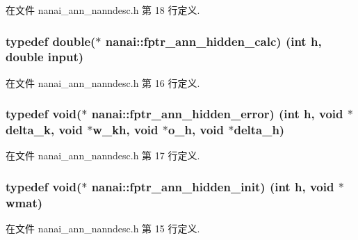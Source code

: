 在文件 nanai\+\_\+ann\+\_\+nanndesc.\+h 第 18 行定义.

\hypertarget{namespacenanai_a299d9093f72831a48d205e94e200690c}{}
\subsubsection[{fptr\+\_\+ann\+\_\+hidden\+\_\+calc}]{\setlength{\rightskip}{0pt plus 5cm}typedef double($\ast$ nanai\+::fptr\+\_\+ann\+\_\+hidden\+\_\+calc) (int h, double input)}\label{namespacenanai_a299d9093f72831a48d205e94e200690c}


在文件 nanai\+\_\+ann\+\_\+nanndesc.\+h 第 16 行定义.

\hypertarget{namespacenanai_aa8cd8d38cbd0a27e2818f132a3cfa2a2}{}
\subsubsection[{fptr\+\_\+ann\+\_\+hidden\+\_\+error}]{\setlength{\rightskip}{0pt plus 5cm}typedef void($\ast$ nanai\+::fptr\+\_\+ann\+\_\+hidden\+\_\+error) (int h, void $\ast$delta\+\_\+k, void $\ast$w\+\_\+kh, void $\ast$o\+\_\+h, void $\ast$delta\+\_\+h)}\label{namespacenanai_aa8cd8d38cbd0a27e2818f132a3cfa2a2}


在文件 nanai\+\_\+ann\+\_\+nanndesc.\+h 第 17 行定义.

\hypertarget{namespacenanai_a5fc4ff646e59919360af1ef410fe9671}{}
\subsubsection[{fptr\+\_\+ann\+\_\+hidden\+\_\+init}]{\setlength{\rightskip}{0pt plus 5cm}typedef void($\ast$ nanai\+::fptr\+\_\+ann\+\_\+hidden\+\_\+init) (int h, void $\ast$wmat)}\label{namespacenanai_a5fc4ff646e59919360af1ef410fe9671}


在文件 nanai\+\_\+ann\+\_\+nanndesc.\+h 第 15 行定义.

\hypertarget{namespacenanai_a681d28f80aa95597ffc268b3b01abcfc}{}
